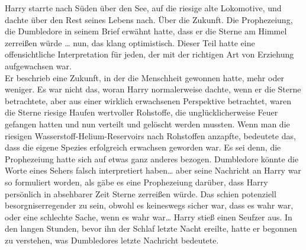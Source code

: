 {Harry starrte nach Süden über den See, auf die riesige alte Lokomotive, und dachte über den Rest seines Lebens nach. Über die Zukunft. Die Prophezeiung, die Dumbledore in seinem Brief erwähnt hatte, dass er die Sterne am Himmel zerreißen würde … nun, das klang optimistisch. Dieser Teil hatte eine offensichtliche Interpretation für jeden, der mit der richtigen Art von Erziehung aufgewachsen war.\\ Er beschrieb eine Zukunft, in der die Menschheit gewonnen hatte, mehr oder weniger. Es war nicht das, woran Harry normalerweise dachte, wenn er die Sterne betrachtete, aber aus einer wirklich erwachsenen Perspektive betrachtet, waren die Sterne riesige Haufen wertvoller Rohstoffe, die unglücklicherweise Feuer gefangen hatten und nun verteilt und gelöscht werden mussten. Wenn man die riesigen Wasserstoff-Helium-Reservoirs nach Rohstoffen anzapfte, bedeutete das, dass die eigene Spezies erfolgreich erwachsen geworden war. Es sei denn, die Prophezeiung hatte sich auf etwas ganz anderes bezogen. Dumbledore könnte die Worte eines Sehers falsch interpretiert haben… aber seine Nachricht an Harry war so formuliert worden, als gäbe es eine Prophezeiung darüber, dass Harry persönlich in absehbarer Zeit Sterne zerreißen würde. Das schien potenziell besorgniserregender zu sein, obwohl es keineswegs sicher war, dass es wahr war, oder eine schlechte Sache, wenn es wahr war… Harry stieß einen Seufzer aus. In den langen Stunden, bevor ihn der Schlaf letzte Nacht ereilte, hatte er begonnen zu verstehen, was Dumbledores letzte Nachricht bedeutete.

}
